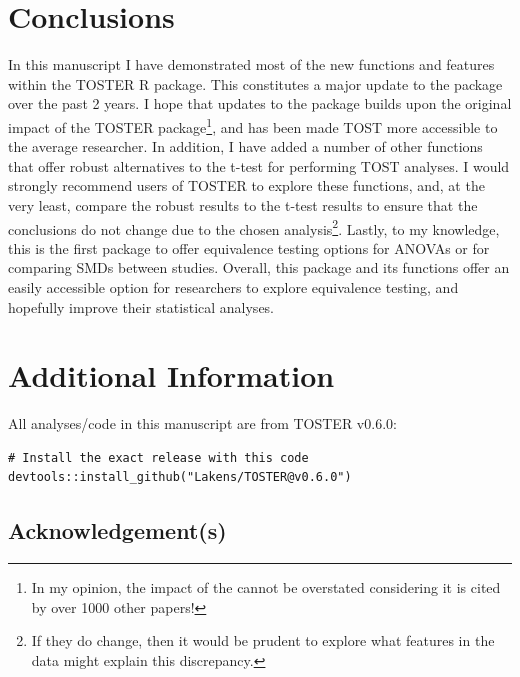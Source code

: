 \documentclass[]{interact}
\theoremstyle{plain}%
\theoremstyle{definition}
\theoremstyle{remark}
\begin{document}
\newpage

\hypertarget{conclusions}{%
\section{Conclusions}\label{conclusions}}

In this manuscript I have demonstrated most of the new functions and
features within the TOSTER R package. This constitutes a major update to
the package over the past 2 years. I hope that updates to the package
builds upon the original impact of the TOSTER package\footnote{In my
  opinion, the impact of the \citet{lakens_ori} cannot be overstated
  considering it is cited by over 1000 other papers!}, and has been made
TOST more accessible to the average researcher. In addition, I have
added a number of other functions that offer robust alternatives to the
t-test for performing TOST analyses. I would strongly recommend users of
TOSTER to explore these functions, and, at the very least, compare the
robust results to the t-test results to ensure that the conclusions do
not change due to the chosen analysis\footnote{If they do change, then
  it would be prudent to explore what features in the data might explain
  this discrepancy.}. Lastly, to my knowledge, this is the first package
to offer equivalence testing options for ANOVAs or for comparing SMDs
between studies. Overall, this package and its functions offer an easily
accessible option for researchers to explore equivalence testing, and
hopefully improve their statistical analyses.

\newpage

\hypertarget{additional-information}{%
\section{Additional Information}\label{additional-information}}

All analyses/code in this manuscript are from TOSTER v0.6.0:

\begin{verbatim}
# Install the exact release with this code
devtools::install_github("Lakens/TOSTER@v0.6.0")
\end{verbatim}

\hypertarget{acknowledgements}{%
\subsection*{Acknowledgement(s)}\label{acknowledgements}}
\end{document}
